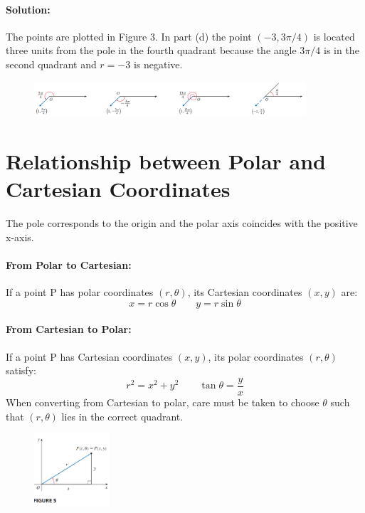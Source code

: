 \documentclass{article}
\begin{document}
\paragraph{Solution:} The points are plotted in Figure 3. In part (d) the point $(-3, 3\pi/4)$ is located three units from the pole in the fourth quadrant because the angle $3\pi/4$ is in the second quadrant and $r=-3$ is negative.

\begin{figure}[htbp]
    \centering
    \includegraphics[width=0.9\textwidth]{graph31.png}
\end{figure}

\section*{Relationship between Polar and Cartesian Coordinates}
The pole corresponds to the origin and the polar axis coincides with the positive x-axis.

\paragraph{From Polar to Cartesian:} If a point P has polar coordinates $(r, \theta)$, its Cartesian coordinates $(x,y)$ are:
\[ x = r\cos\theta \qquad y = r\sin\theta \]

\paragraph{From Cartesian to Polar:} If a point P has Cartesian coordinates $(x,y)$, its polar coordinates $(r, \theta)$ satisfy:
\[ r^2 = x^2 + y^2 \qquad \tan\theta = \frac{y}{x} \]
When converting from Cartesian to polar, care must be taken to choose $\theta$ such that $(r, \theta)$ lies in the correct quadrant.
\begin{figure}[htbp]
    \centering
    \includegraphics[width=0.25\textwidth]{graph32.png}
\end{figure}
\end{document}
